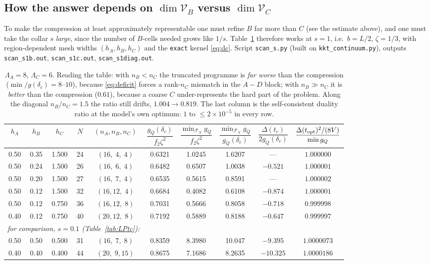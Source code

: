\documentclass[11pt]{article}
\begin{document}
\subsection{How the answer depends on $\dim\mathcal V_B$ versus $\dim\mathcal V_C$}
\label{sec:s1}
To make the compression at least approximately representable one must refine $B$ far more than
$C$ (see the estimate above), and one must take the collar $s$ \emph{large}, since the number of
$B$-cells needed grows like $1/s$.  Table~\ref{tab:s1} therefore works at $s=1$, i.e.\ $b=L/2$,
$\zeta=1/3$, with region-dependent mesh widths $(h_A,h_B,h_C)$ and the \texttt{exact} kernel
\eqref{eq:dc}.  Script \texttt{scan\_s.py} (built on \texttt{kkt\_continuum.py}), outputs
\texttt{scan\_s1b.out}, \texttt{scan\_s1c.out}, \texttt{scan\_s1diag.out}.

\begin{table}[h]\centering\small
\begin{tabular}{cccccccccc}
\toprule
$h_A$&$h_B$&$h_C$&$N$&$(n_A,n_B,n_C)$&$\dfrac{g_Q(\delta_c)}{f_2\zeta^2}$&
$\dfrac{\min_{\mathcal F_N}g_Q}{f_2\zeta^2}$&$\dfrac{\min_{\mathcal F_N}g_Q}{g_Q(\delta_c)}$&
$\dfrac{\Delta(t_c)}{2g_Q(\delta_c)}$&$\dfrac{\Delta(t_{\rm opt})^2/(8V)}{\min g_Q}$\\
\midrule
0.50&0.35&1.500&24&$(16,\;4,\;4)$&0.6321&1.0245&1.6207&---&$1.000000$\\
0.50&0.24&1.500&26&$(16,\;6,\;4)$&0.6482&0.6507&1.0038&$-0.521$&$1.000001$\\
0.50&0.20&1.500&27&$(16,\;7,\;4)$&0.6535&0.5615&0.8591&---&$1.000002$\\
0.50&0.12&1.500&32&$(16,12,\;4)$&0.6684&0.4082&0.6108&$-0.874$&$1.000001$\\
0.50&0.12&0.750&36&$(16,12,\;8)$&0.7031&0.5666&0.8058&$-0.718$&$0.999998$\\
0.40&0.12&0.750&40&$(20,12,\;8)$&0.7192&0.5889&0.8188&$-0.647$&$0.999997$\\
\midrule
\multicolumn{5}{l}{\emph{for comparison, $s=0.1$ (Table~\ref{tab:LPtc}):}}&&&&&\\
0.50&0.50&0.500&31&$(16,\;7,\;8)$&0.8359&8.3980&10.047&$-9.395$&$1.0000073$\\
0.40&0.40&0.400&44&$(20,\;9,15)$&0.8675&7.1686&8.2635&$-10.325$&$1.0000186$\\
\bottomrule
\end{tabular}
\caption{$\Lambda_A=8$, $\Lambda_C=6$.  Reading the table: with $n_B<n_C$ the truncated programme
is \emph{far worse} than the compression ($\min/g(\delta_c)=8$--$10$), because \eqref{eq:deficit}
forces a rank-$n_C$ mismatch in the $A\!-\!D$ block; with $n_B\gg n_C$ it is \emph{better} than the
compression ($0.61$), because a coarse $C$ under-represents the hard part of the problem.  Along
the diagonal $n_B/n_C=1.5$ the ratio still drifts, $1.004\to0.819$.  The last column is the
self-consistent duality ratio at the model's own optimum: $1$ to $\le2\times10^{-5}$ in every row.}
\label{tab:s1}
\end{table}
\end{document}
